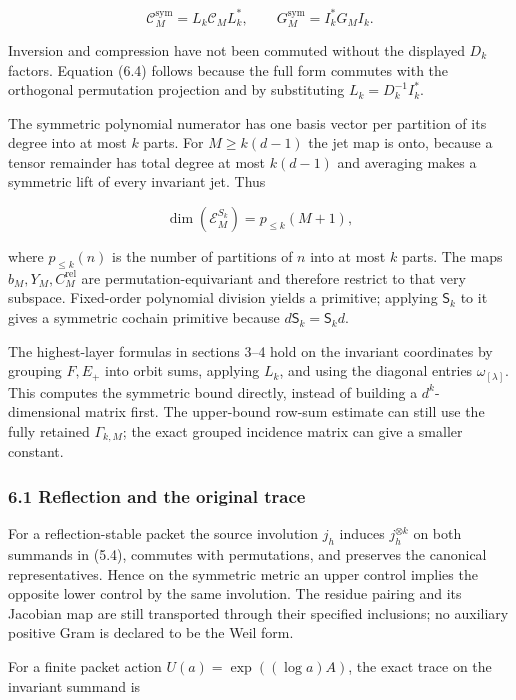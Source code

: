 \documentclass[
]{article}
\begin{document}
\[\boxed{\mathcal C_M^{\mathrm{sym}}=L_k\mathcal C_ML_k^*,\qquad
G_M^{\mathrm{sym}}=I_k^*G_MI_k.}\tag{6.4}\]

Inversion and compression have not been commuted without the displayed
\(D_k\) factors. Equation (6.4) follows because the full form commutes
with the orthogonal permutation projection and by substituting
\(L_k=D_k^{-1}I_k^*\).

The symmetric polynomial numerator has one basis vector per partition of
its degree into at most \(k\) parts. For \(M\ge k(d-1)\) the jet map is
onto, because a tensor remainder has total degree at most \(k(d-1)\) and
averaging makes a symmetric lift of every invariant jet. Thus

\[\boxed{\dim(\mathcal E_M^{S_k})=p_{\le k}(M+1),}\tag{6.5}\]

where \(p_{\le k}(n)\) is the number of partitions of \(n\) into at most
\(k\) parts. The maps \(b_M,Y_M,C_M^{\mathrm{rel}}\) are
permutation-equivariant and therefore restrict to that very subspace.
Fixed-order polynomial division yields a primitive; applying
\(\mathsf S_k\) to it gives a symmetric cochain primitive because
\(d\mathsf S_k=\mathsf S_kd\).

The highest-layer formulas in sections 3--4 hold on the invariant
coordinates by grouping \(F,E_+\) into orbit sums, applying \(L_k\), and
using the diagonal entries \(\omega_{[\lambda]}\). This computes the
symmetric bound directly, instead of building a \(d^k\)-dimensional
matrix first. The upper-bound row-sum estimate can still use the fully
retained \(\Gamma_{k,M}\); the exact grouped incidence matrix can give a
smaller constant.

\subsubsection{6.1 Reflection and the original
trace}\label{reflection-and-the-original-trace}

For a reflection-stable packet the source involution \(j_h\) induces
\(j_h^{\otimes k}\) on both summands in (5.4), commutes with
permutations, and preserves the canonical representatives. Hence on the
symmetric metric an upper control implies the opposite lower control by
the same involution. The residue pairing and its Jacobian map are still
transported through their specified inclusions; no auxiliary positive
Gram is declared to be the Weil form.

For a finite packet action \(U(a)=\exp((\log a)A)\), the exact trace on
the invariant summand is
\end{document}
